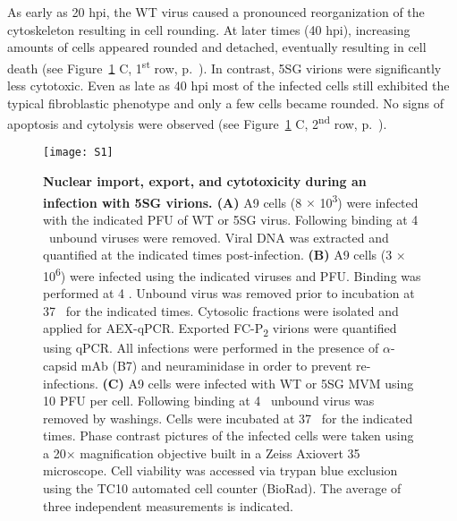 As early as 20 hpi, the WT virus caused a pronounced reorganization of the cytoskeleton resulting in cell rounding. At later times (40 hpi), increasing amounts of cells appeared rounded and detached, eventually resulting in cell death (see Figure~\ref{S1} C, 1\textsuperscript{st} row, p.~\pageref{S1}). In contrast, 5SG virions were significantly less cytotoxic. Even as late as 40 hpi most of the infected cells still exhibited the typical fibroblastic phenotype and only a few cells became rounded. No signs of apoptosis and cytolysis were observed (see Figure~\ref{S1} C, 2\textsuperscript{nd} row, p.~\pageref{S1}). 

\begin{figure}[H]
\centering
  \texttt{[image: S1]} \\[0.3cm]
  \caption[Nuclear import, export, and cytotoxicity during an infection with 5SG virions]
   {\textbf{Nuclear import, export, and cytotoxicity during an infection with 5SG virions. (A)} A9 cells (8 $\times$ 10\textsuperscript{3}) were infected with the indicated PFU of WT or 5SG virus. Following binding at 4 \textcelsius~unbound viruses were removed. Viral DNA was extracted and quantified at the indicated times post-infection. \textbf{(B)} A9 cells (3 $\times$ 10\textsuperscript{6}) were infected using the indicated viruses and PFU. Binding was performed at 4 \textcelsius. Unbound virus was removed prior to incubation at 37 \textcelsius~for the indicated times. Cytosolic fractions were isolated and applied for AEX-qPCR. Exported FC-P\textsubscript{2} virions were quantified using qPCR. All infections were performed in the presence of $\alpha$-capsid mAb (B7) and neuraminidase in order to prevent re-infections. \textbf{(C)} A9 cells were infected with WT or 5SG MVM using 10 PFU per cell. Following binding at 4 \textcelsius~unbound virus was removed by washings. Cells were incubated at 37 \textcelsius~for the indicated times. Phase contrast pictures of the infected cells were taken using a 20$\times$ magnification objective built in a Zeiss Axiovert 35 microscope. Cell viability was accessed via trypan blue exclusion using the TC10\textsuperscript{\texttrademark} automated cell counter (BioRad). The average of three independent measurements is indicated.} 
\label{S1}
\end{figure}

